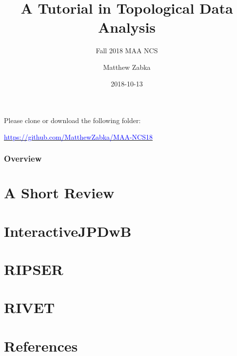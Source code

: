\documentclass[handout]{beamer}
\title{A Tutorial in Topological Data Analysis} %
\subtitle{Fall 2018 MAA NCS}
\author{Matthew Zabka}
\institute[SMSU]{Mathematics and Computer Science \\ Southwest Minnesota State University} %
{
}
\date{2018-10-13} %
\begin{document}
\begin{frame}
\titlepage %
\begin{center}
Please clone or download the following folder:
\end{center}
\begin{center}
\hyperref[https://github.com/MatthewZabka/MAA-NCS18.git]{\textcolor{blue}{https://github.com/MatthewZabka/MAA-NCS18}}
\end{center}
\end{frame}
\begin{frame}
\frametitle{Overview} %
\tableofcontents 
\end{frame}
\section{A Short Review}

\section{InteractiveJPDwB}

\section{RIPSER}

\section{RIVET}

\section{References}
\begin{frame}


\end{frame}
\end{document}
